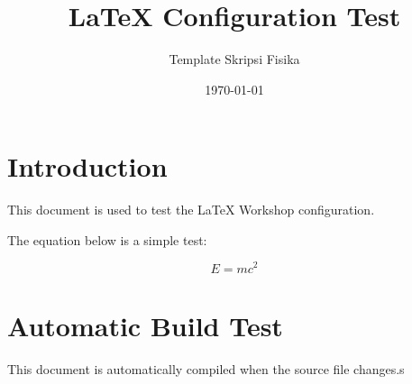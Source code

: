 \documentclass{article}
\title{LaTeX Configuration Test}
\author{Template Skripsi Fisika}
\date{\today}
\begin{document}
\maketitle

\section{Introduction}

This document is used to test the
LaTeX Workshop configuration.

The equation below is a simple test:

\begin{equation}
    E = mc^2
\end{equation}

\section{Automatic Build Test}

This document is automatically
compiled when the source file changes.s
\end{document}
